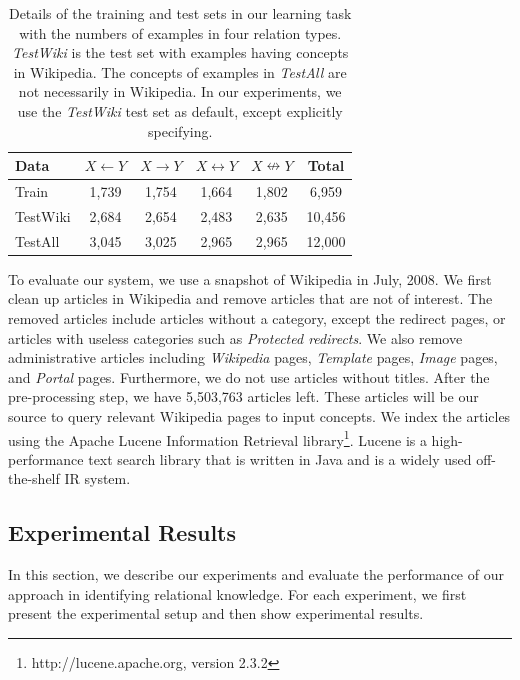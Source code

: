 \begin{table}[h]
  \small
  \begin{center}
    \begin{tabular}{|l||c|c|c|c|c|}
      \hline
      Data & $X \leftarrow Y$ & $X \rightarrow Y$  & $X \leftrightarrow Y$  & $X \nleftrightarrow Y$ & Total \\
      \hline
      \hline
      Train  & 1,739 & 1,754 & 1,664 & 1,802 & 6,959\\
      TestWiki   & 2,684 & 2,654 & 2,483 & 2,635 & 10,456 \\
      TestAll & 3,045 & 3,025 & 2,965 & 2,965 & 12,000 \\
      \hline
    \end{tabular}
    \caption{Details of the training and test sets in our learning task
      with the numbers of examples in four relation types. {\em
        TestWiki} is the test set with examples having concepts in
      Wikipedia. The concepts of examples in {\em TestAll} are not
      necessarily in Wikipedia. In our experiments, we use the {\em
        TestWiki} test set as default, except explicitly specifying.}
    \label{tab:detail-dataset}
  \end{center}
\end{table}

To evaluate our system, we use a snapshot of Wikipedia in July,
2008. We first clean up articles in Wikipedia and remove articles that
are not of interest. The removed articles include articles without a
category, except the redirect pages, or articles with useless categories
such as {\em Protected redirects}. We also remove
administrative articles including {\em Wikipedia} pages, {\em
  Template} pages, {\em Image} pages, and {\em Portal}
pages. Furthermore, we do not use articles without titles. After the
pre-processing step, we have 5,503,763 articles left. These articles
will be our source to query relevant Wikipedia pages to input
concepts. We index the articles using the Apache Lucene Information
Retrieval library\footnote{http://lucene.apache.org, version
  2.3.2}. Lucene is a high-performance text search library that is
written in Java and is a widely used off-the-shelf IR system.

\subsection{Experimental Results}
\label{sec:exp-results}

In this section, we describe our experiments and evaluate the
performance of our approach in identifying relational knowledge. For
each experiment, we first present the experimental setup and then show
experimental results.

